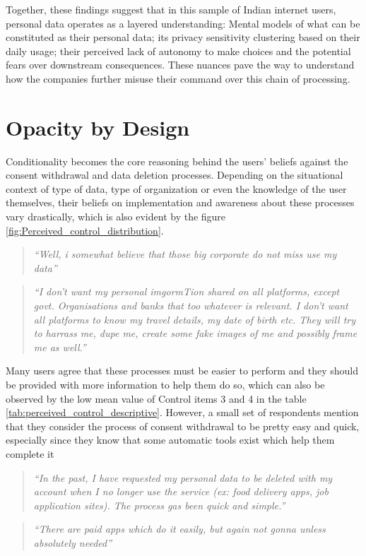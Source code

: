 Together, these findings suggest that in this sample of Indian internet users, personal data operates as a layered understanding: Mental models of what can be constituted as their personal data; its privacy sensitivity clustering based on their daily usage; their perceived lack of autonomy to make choices and the potential fears over downstream consequences. These nuances pave the way to understand how the companies further misuse their command over this chain of processing. 

\section{Opacity by Design} \label{sec:companies distrust} 
 
Conditionality becomes the core reasoning behind the users' beliefs against the consent withdrawal and data deletion processes. Depending on the situational context of type of data, type of organization or even the knowledge of the user themselves, their beliefs on implementation and awareness about these processes vary drastically, which is also evident by the figure \ref{fig:Perceived_control_distribution}.

\begin{quote}
  \textit{``Well, i somewhat believe that those big corporate do not miss use my data''}
\end{quote}
\begin{quote}
    \textit{``I don't want my personal imgormTion shared on all platforms, except govt. Organisations and banks that too whatever is relevant. I don't want all platforms to know my travel details, my date of birth etc. They will try to harrass me, dupe me, create some fake images of me and possibly frame me as well.''}
\end{quote}

Many users agree that these processes must be easier to perform and they should be provided with more information to help them do so, which can also be observed by the low mean value of Control items 3 and 4 in the table \ref{tab:perceived_control_descriptive}. However, a small set of respondents mention that they consider the process of consent withdrawal to be pretty easy and quick, especially since they know that some automatic tools exist which help them complete it 
\begin{quote}
    \textit{``In the past, I have requested my personal data to be deleted with my account when I no longer use the service (ex: food delivery apps, job application sites). The process gas been quick and simple.''}
\end{quote}
\begin{quote}
    \textit{``There are paid apps which do it easily, but again not gonna unless absolutely needed''}
\end{quote}

